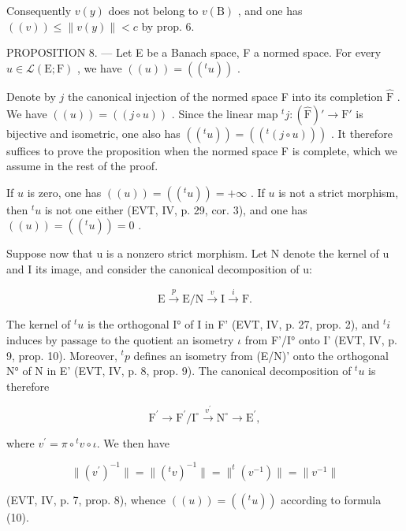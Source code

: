 Consequently \(v(y)\) does not belong to \(v(\mathrm{B})\) , and one has \(((v)) \leqslant \| v(y) \| < c\) by prop. 6.

PROPOSITION 8. --- Let E be a Banach space, F a normed space. For every \(u \in \mathcal{L}(\mathrm{E};\mathrm{F})\) , we have \(((u)) = ((^t u))\) .

Denote by \(j\) the canonical injection of the normed space F into its completion \(\widehat{\mathrm{F}}\) . We have \(((u)) = ((j \circ u))\) . Since the linear map \(^t j: (\widehat{\mathrm{F}})' \to \mathrm{F}'\) is bijective and isometric, one also has \(((^t u)) = ((^t (j \circ u)))\) . It therefore suffices to prove the proposition when the normed space F is complete, which we assume in the rest of the proof.

If \(u\) is zero, one has \(((u)) = ((^t u)) = +\infty\) . If \(u\) is not a strict morphism, then \(^t u\) is not one either (EVT, IV, p. 29, cor. 3), and one has \(((u)) = ((^t u)) = 0\) .

Suppose now that u is a nonzero strict morphism. Let N denote the kernel of u and I its image, and consider the canonical decomposition of u:

\[
\mathrm{E} \xrightarrow {p} \mathrm{E/N} \xrightarrow {v} \mathrm{I} \xrightarrow {i} \mathrm{F}.
\]

The kernel of \(^{t}u\) is the orthogonal I° of I in F' (EVT, IV, p. 27, prop. 2), and \(^{t}i\) induces by passage to the quotient an isometry \(\iota\) from F'/I° onto I' (EVT, IV, p. 9, prop. 10). Moreover, \(^{t}p\) defines an isometry from (E/N)' onto the orthogonal N° of N in E' (EVT, IV, p. 8, prop. 9). The canonical decomposition of \(^{t}u\) is therefore

\[
\mathrm{F} ^ {\prime} \longrightarrow \mathrm{F} ^ {\prime} / \mathrm{I} ^ {\circ} \stackrel {v ^ {\prime}} {\longrightarrow} \mathrm{N} ^ {\circ} \longrightarrow \mathrm{E} ^ {\prime},
\]

where \(v^{\prime} = \pi \circ{}^{t}v\circ \iota\). We then have

\[
\| (v ^ {\prime}) ^ {- 1} \| = \| (^ {t} v) ^ {- 1} \| = \| ^ {t} (v ^ {- 1}) \| = \| v ^ {- 1} \|
\]

(EVT, IV, p. 7, prop. 8), whence \(((u)) = ((^t u))\) according to formula (10).

